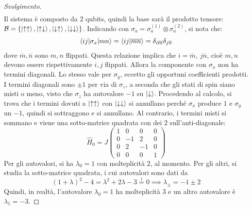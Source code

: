 \documentclass[11pt, a4paper]{scrartcl} %
\numberwithin{equation}{subsection}
\theoremstyle{style2}
\theoremstyle{style1}
\renewcommand\qedsymbol{$\blacksquare$}
\newenvironment{svolgimento}{\renewcommand\qedsymbol{$\spadesuit$}\begin{proof}[Svolgimento]}{\end{proof}}
\begin{document}
\begin{enumerate}[(a).]
\begin{svolgimento}
\[\begin{split}
		\end{split}
		\] 
		Il sistema \`e composto da 2 qubits, quindi la base sar\`a il prodotto tensore: $\mathcal{B}= \left\{ \ket{\uparrow\uparrow} , \ket{\uparrow\downarrow} , \ket{\downarrow\uparrow} , \ket{ \downarrow\downarrow}  \right\} $.
		Indicando con $\sigma _a = \sigma _a^{(1)} \otimes \sigma _a ^{(2)} $, si nota che:
		\[
		\braket{ij|\sigma _x|mn} = \braket{ij|\overline{m} \overline{n}} = \delta _{i \overline{m}} \delta _{j \overline{n}} 
		\] 
	dove $\overline{m}, \overline{n}$ sono $m,n$ flippati. 
	Questa relazione implica che $i = \overline{m}, \ j \overline{n}$, cio\`e $m,n$ devono essere rispettivamente $i,j$ flippati.
	Allora la componente con $\sigma _x$ non ha termini diagonali. 
	Lo stesso vale per $\sigma _y$, eccetto gli opportuni coefficienti prodotti. 
	I termini diagonali sono $\pm1$ per via di $\sigma _z$, a seconda che gli stati di spin siano misti o meno, visto che $\sigma _z$ ha autovalore $-1$ su $\ket{\downarrow} $.
	Procedendo al calcolo, si trova che i termini dovuti a $\ket{\uparrow \uparrow} $ con $\ket{\downarrow\downarrow} $ si annullano perch\'e $\sigma _x$ produce $1$ e $\sigma _y$ un $-1$, quindi si sottraggono e si annullano. 
	Al contrario, i termini misti si sommano e viene una sotto-matrice quadrata con dei $2$ sull'anti-diagonale:
	\[
		\hat{H}_0 = J\begin{pmatrix} 1 & 0& 0&0 \\ 0& -1 & 2 &0 \\ 0&2&-1&0\\ 0&0&0&1 \end{pmatrix} 
	\] 
			Per gli autovalori, si ha $\lambda _0 = 1$ con molteplicit\`a $2$, al momento.
			Per gli altri, si studia la sotto-matrice quadrata, i cui autovalori sono dati da
			\[
				(1+\lambda )^2- 4= \lambda ^2 + 2 \lambda  -3 \stackrel{!}{=} 0\implies \lambda _\pm = -1 \pm 2
			\] 
		Quindi, in realt\`a, l'autovalore $\lambda _0 = 1$ ha molteplicit\`a $3$ e un altro autovalore \`e $\lambda _1 = -3$.


\end{svolgimento}
\end{enumerate}
\end{document}
